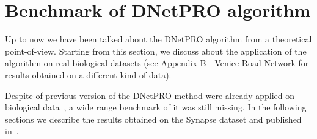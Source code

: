 \documentclass{standalone}
\begin{document}
\section[Benchmark]{Benchmark of DNetPRO algorithm}\label{synapse:benchmark}

Up to now we have been talked about the DNetPRO algorithm from a theoretical point-of-view.
Starting from this section, we discuss about the application of the algorithm on real biological datasets (see Appendix B - Venice Road Network for results obtained on a different kind of data).

Despite of previous version of the DNetPRO method were already applied on biological data~\cite{PMrna, Scotlandi2009, PMgene, Terragna}, a wide range benchmark of it was still missing.
In the following sections we describe the results obtained on the Synapse dataset and published in~\cite{Curti2019}.
\end{document}
